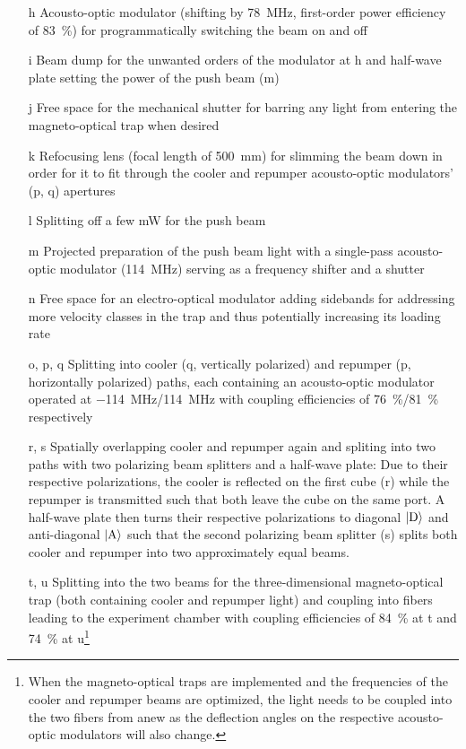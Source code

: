 \begin{itemize}
    \item[h] Acousto-optic modulator (shifting by \SI{+78}{\mega\hertz}, first-order power efficiency of \SI{83}{\percent}) for programmatically switching the beam on and off
    
    \item[i] Beam dump for the unwanted orders of the modulator at h and half-wave plate setting the power of the push beam (m)
    
    \item[j] Free space for the mechanical shutter for barring any light from entering the magneto-optical trap when desired
    
    \item[k] Refocusing lens (focal length of \SI{500}{\milli\meter}) for slimming the beam down in order for it to fit through the cooler and repumper acousto-optic modulators' (p, q) apertures
    
    \item[l] Splitting off a few \si{\milli\watt} for the push beam

    \item[m] Projected preparation  of the push beam light with a single-pass acousto-optic modulator (\SI{+114}{\mega\hertz}) serving as a frequency shifter and a shutter
    
    \item[n] Free space for an electro-optical modulator adding sidebands for addressing more velocity classes in the trap and thus potentially increasing its loading rate
    
    \item[o, p, q] Splitting into cooler (q, vertically polarized) and repumper (p, horizontally polarized) paths, each containing an acousto-optic modulator operated at \SI{-114}{\mega\hertz}/\SI{+114}{\mega\hertz} with coupling efficiencies of \SI{76}{\percent}/\SI{81}{\percent} respectively
    
    \item[r, s] Spatially overlapping cooler and repumper again and spliting into two paths with two polarizing beam splitters and a half-wave plate: Due to their respective polarizations, the cooler is reflected on the first cube (r) while the repumper is transmitted such that both leave the cube on the same port. A half-wave plate then turns their respective polarizations to diagonal $\Ket{\text{D}}$ and anti-diagonal $\Ket{\text{A}}$ such that the second polarizing beam splitter (s) splits both cooler and repumper into two approximately equal beams.
    
    \item[t, u] Splitting into the two beams for the three-dimensional magneto-optical trap (both containing cooler and repumper light) and coupling into fibers leading to the experiment chamber with coupling efficiencies of \SI{84}{\percent} at t and \SI{74}{\percent} at u\footnote{When the magneto-optical traps are implemented and the frequencies of the cooler and repumper beams are optimized, the light needs to be coupled into the two fibers from anew as the deflection angles on the respective acousto-optic modulators will also change.}
\end{itemize}

